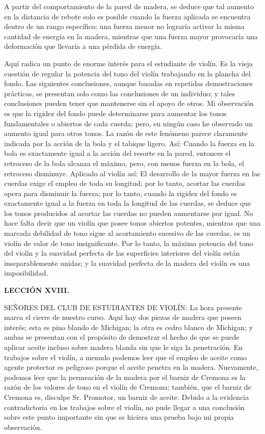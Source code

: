 \documentclass[12pt]{book}
\begin{document}
A partir del comportamiento de la pared de madera, se deduce que tal aumento en la distancia de rebote solo es posible cuando la fuerza aplicada se encuentra dentro de un rango específico: una fuerza menor no lograría activar la misma cantidad de energía en la madera, mientras que una fuerza mayor provocaría una deformación que llevaría a una pérdida de energía. 

Aquí radica un punto de enorme interés para el estudiante de violín.
Es la vieja cuestión de regular la potencia del tono del violín trabajando en la plancha del fondo. Las siguientes conclusiones, aunque basadas en repetidas demostraciones prácticas, se presentan solo como las conclusiones de un individuo; y tales conclusiones pueden tener que mantenerse sin el apoyo de otros. Mi observación es que la rigidez del fondo puede determinarse para aumentar los tonos fundamentales o abiertos de cada cuerda; pero, en ningún caso he observado un aumento igual para otros tonos. La razón de este fenómeno parece claramente indicada por la acción de la bola y el tabique ligero. Así: Cuando la fuerza en la bola es exactamente igual a la acción del resorte en la pared, entonces el retroceso de la bola alcanza el máximo, pero, con menos fuerza en la bola, el retroceso disminuye. Aplicado al violín así: El desarrollo de la mayor fuerza en las cuerdas exige el empleo de toda su longitud; por lo tanto, acortar las cuerdas opera para disminuir la fuerza; por lo tanto, cuando la rigidez del fondo es exactamente igual a la fuerza en toda la longitud de las cuerdas, se deduce que los tonos producidos al acortar las cuerdas no pueden aumentarse por igual. No hace falta decir que un violín que posee tonos abiertos potentes, mientras que una marcada debilidad de tono sigue al acortamiento sucesivo de las cuerdas, es un violín de valor de tono insignificante. Por lo tanto, la máxima potencia del tono del violín y la suavidad perfecta de las superficies interiores del violín están inseparablemente unidas; y la suavidad perfecta de la madera del violín es una imposibilidad.

\textbf{LECCIÓN XVIII.}

SEÑORES DEL CLUB DE ESTUDIANTES DE VIOLÍN: La hora presente marca el cierre de nuestro curso. Aquí hay dos piezas de madera que poseen interés; esta es pino blando de Michigan; la otra es cedro blanco de Michigan; y ambas se presentan con el propósito de demostrar el hecho de que se puede aplicar aceite incluso sobre madera blanda sin que le siga la penetración. En trabajos sobre el violín, a menudo podemos leer que el empleo de aceite como agente protector es peligroso porque el aceite penetra en la madera. Nuevamente, podemos leer que la permeación de la madera por el barniz de Cremona es la razón de los valores de tono en el violín de Cremona; también, que el barniz de Cremona es, disculpe Sr. Promotor, un barniz de aceite. Debido a la evidencia contradictoria en los trabajos sobre el violín, no pude llegar a una conclusión sobre este punto importante sin que se hiciera una prueba bajo mi propia observación.
\end{document}
